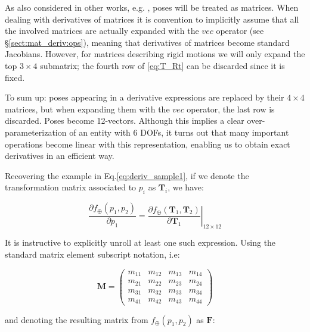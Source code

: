 \documentclass[a4paper,11pt]{report}
\begin{document}
As also considered in other works, e.g. \cite{strasdat2010scale}, poses will be treated 
as matrices.
When dealing with derivatives of matrices it is convention to implicitly assume 
that all the involved matrices are actually expanded with the $vec$ operator (see \S\ref{sect:mat_deriv:ops}),
meaning that derivatives of matrices become standard Jacobians.
However, for matrices describing rigid motions we will only expand 
the top $3 \times 4$ submatrix; the fourth row of \ref{eq:T_Rt} can be discarded since it is fixed.

To sum up: poses appearing in a derivative expressions are replaced by their $4 \times 4$ 
matrices, but when expanding them with the $vec$ operator, the last row is discarded.
Poses become 12-vectors. 
Although this implies a clear over-parameterization of an entity with 6 DOFs, it turns
out that many important operations become linear with this representation, enabling us to
obtain exact derivatives in an efficient way.

Recovering the example in Eq.\ref{eq:deriv_sample1}, if we denote the 
transformation matrix associated to $p_i$ as $\mathbf{T}_i$, we have:

\begin{equation}
\label{eq:deriv_sample2}
\frac{\partial f_\oplus(p_1,p_2)}{\partial p_1} = 
\left.
\frac{\partial f_\oplus(\mathbf{T}_1,\mathbf{T}_2)}{\partial \mathbf{T}_1}
\right|_{12 \times 12}
\end{equation}

It is instructive to explicitly unroll at least one such expression. 
Using the standard matrix element subscript notation, i.e:

\begin{equation}
\label{eq:deriv_sample2b}
\mathbf{M} = 
\left(
\begin{array}{cccc}
 m_{11} & m_{12} & m_{13} & m_{14}  \\
 m_{21} & m_{22} & m_{23} & m_{24}  \\
 m_{31} & m_{32} & m_{33} & m_{34}  \\
 m_{41} & m_{42} & m_{43} & m_{44}
\end{array}
\right)
\end{equation}

\noindent and denoting the resulting matrix from $f_\oplus(p_1,p_2)$ as $\mathbf{F}$:
\end{document}
